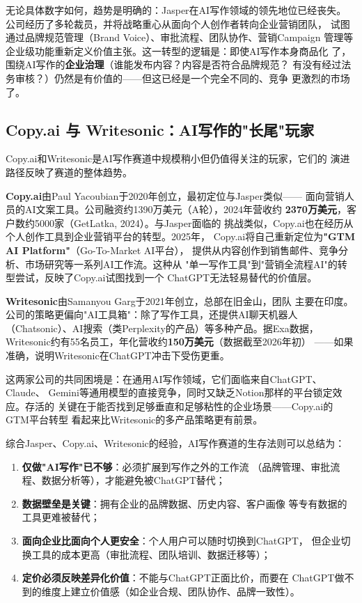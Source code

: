 无论具体数字如何，趋势是明确的：Jasper在AI写作领域的领先地位已经丧失。
公司经历了多轮裁员，并将战略重心从面向个人创作者转向企业营销团队，
试图通过品牌规范管理（Brand Voice）、审批流程、团队协作、营销Campaign
管理等企业级功能重新定义价值主张。这一转型的逻辑是：即使AI写作本身商品化
了，围绕AI写作的\textbf{企业治理}（谁能发布内容？内容是否符合品牌规范？
有没有经过法务审核？）仍然是有价值的——但这已经是一个完全不同的、竞争
更激烈的市场了。

\subsection{Copy.ai 与 Writesonic：AI写作的"长尾"玩家}
\label{subsec:copyai-writesonic}

Copy.ai和Writesonic是AI写作赛道中规模稍小但仍值得关注的玩家，它们的
演进路径反映了赛道的整体趋势。

\textbf{Copy.ai}由Paul Yacoubian于2020年创立，最初定位与Jasper类似——
面向营销人员的AI文案工具。公司融资约1390万美元（A轮），2024年营收约
\textbf{2370万美元}，客户数约5000家（GetLatka, 2024）。与Jasper面临的
挑战类似，Copy.ai也在经历从个人创作工具到企业营销平台的转型。2025年，
Copy.ai将自己重新定位为\textbf{"GTM AI Platform"}（Go-To-Market AI平台），
提供从内容创作到销售邮件、竞争分析、市场研究等一系列AI工作流。这种从
"单一写作工具"到"营销全流程AI"的转型尝试，反映了Copy.ai试图找到一个
ChatGPT无法轻易替代的价值层。

\textbf{Writesonic}由Samanyou Garg于2021年创立，总部在旧金山，团队
主要在印度。公司的策略更偏向"AI工具箱"：除了写作工具，还提供AI聊天机器人
（Chatsonic）、AI搜索（类Perplexity的产品）等多种产品。据Exa数据，
Writesonic约有55名员工，年化营收约\textbf{150万美元}（数据截至2026年初）
——如果准确，说明Writesonic在ChatGPT冲击下受伤更重。

这两家公司的共同困境是：在通用AI写作领域，它们面临来自ChatGPT、Claude、
Gemini等通用模型的直接竞争，同时又缺乏Notion那样的平台锁定效应。存活的
关键在于能否找到足够垂直和足够粘性的企业场景——Copy.ai的GTM平台转型
看起来比Writesonic的多产品策略更有前景。

\begin{corebox}[AI写作工具的生存法则]
综合Jasper、Copy.ai、Writesonic的经验，AI写作赛道的生存法则可以总结为：
\begin{enumerate}
  \item \textbf{仅做"AI写作"已不够}：必须扩展到写作之外的工作流
    （品牌管理、审批流程、数据分析等），才能避免被ChatGPT替代；
  \item \textbf{数据壁垒是关键}：拥有企业的品牌数据、历史内容、客户画像
    等专有数据的工具更难被替代；
  \item \textbf{面向企业比面向个人更安全}：个人用户可以随时切换到ChatGPT，
    但企业切换工具的成本更高（审批流程、团队培训、数据迁移等）；
  \item \textbf{定价必须反映差异化价值}：不能与ChatGPT正面比价，而要在
    ChatGPT做不到的维度上建立价值感（如企业合规、团队协作、品牌一致性）。
\end{enumerate}
\end{corebox}

